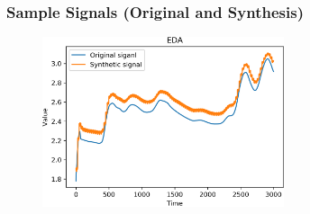 \documentclass[unknownkeysallowed]{beamer}
\begin{document}
\begin{frame}
\frametitle{Sample Signals (Original and Synthesis)}

\begin{figure}
  \centering
  \includegraphics[width=.5\textwidth, height=5cm]{figs/sig_stress_EDA_acii2019_pres.png}\hfill

  \label{sig_plot}
\end{figure}

\end{frame}
\end{document}

